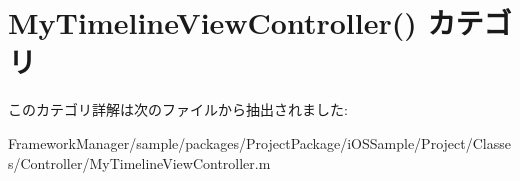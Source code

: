 \hypertarget{category_my_timeline_view_controller_07_08}{}\section{My\+Timeline\+View\+Controller() カテゴリ}
\label{category_my_timeline_view_controller_07_08}


このカテゴリ詳解は次のファイルから抽出されました\+:\begin{DoxyCompactItemize}
\item 
Framework\+Manager/sample/packages/\+Project\+Package/i\+O\+S\+Sample/\+Project/\+Classes/\+Controller/My\+Timeline\+View\+Controller.\+m\end{DoxyCompactItemize}
